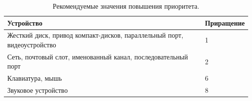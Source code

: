 \documentclass[a4paper,oneside,14pt]{extarticle}
\begin{document}





\begin{table}[h!]
	\caption{Рекомендуемые значения повышения приоритета.}
	\begin{center}
		\begin{tabular}{|p{100mm}|l|}
			\hline
			{Устройство} & {Приращение} \\
			\hline
			Жесткий диск, привод компакт-дисков, параллельный порт, видеоустройство & 1 \\
			\hline
			Сеть, почтовый слот, именованный канал, последовательный порт & 2 \\
			\hline
			Клавиатура, мышь & 6 \\
			\hline
			Звуковое устройство & 8 \\
			\hline
		\end{tabular}
	\end{center}
	\label{tab:io}
\end{table}
\end{document}
